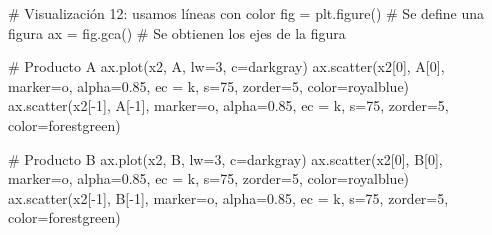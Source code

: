 \documentclass[
  letterpaper,
  DIV=11,
  numbers=noendperiod]{scrreprt}
\newenvironment{Shaded}{\begin{snugshade}}{\end{snugshade}}
\newcommand{\CommentTok}[1]{\textcolor[rgb]{0.37,0.37,0.37}{#1}}
\newcommand{\DecValTok}[1]{\textcolor[rgb]{0.68,0.00,0.00}{#1}}
\newcommand{\FloatTok}[1]{\textcolor[rgb]{0.68,0.00,0.00}{#1}}
\newcommand{\NormalTok}[1]{\textcolor[rgb]{0.00,0.23,0.31}{#1}}
\newcommand{\OperatorTok}[1]{\textcolor[rgb]{0.37,0.37,0.37}{#1}}
\newcommand{\StringTok}[1]{\textcolor[rgb]{0.13,0.47,0.30}{#1}}
\begin{document}
\begin{Shaded}
\begin{Highlighting}[]
\CommentTok{\# Visualización 12: usamos líneas con color}
\NormalTok{fig }\OperatorTok{=}\NormalTok{ plt.figure() }\CommentTok{\# Se define una figura}
\NormalTok{ax }\OperatorTok{=}\NormalTok{ fig.gca()     }\CommentTok{\# Se obtienen los ejes de la figura}

\CommentTok{\# Producto A}
\NormalTok{ax.plot(x2, A, lw}\OperatorTok{=}\DecValTok{3}\NormalTok{, c}\OperatorTok{=}\StringTok{\textquotesingle{}darkgray\textquotesingle{}}\NormalTok{)}
\NormalTok{ax.scatter(x2[}\DecValTok{0}\NormalTok{], A[}\DecValTok{0}\NormalTok{], marker}\OperatorTok{=}\StringTok{\textquotesingle{}o\textquotesingle{}}\NormalTok{, alpha}\OperatorTok{=}\FloatTok{0.85}\NormalTok{, ec }\OperatorTok{=} \StringTok{\textquotesingle{}k\textquotesingle{}}\NormalTok{, s}\OperatorTok{=}\DecValTok{75}\NormalTok{, zorder}\OperatorTok{=}\DecValTok{5}\NormalTok{, color}\OperatorTok{=}\StringTok{\textquotesingle{}royalblue\textquotesingle{}}\NormalTok{)}
\NormalTok{ax.scatter(x2[}\OperatorTok{{-}}\DecValTok{1}\NormalTok{], A[}\OperatorTok{{-}}\DecValTok{1}\NormalTok{], marker}\OperatorTok{=}\StringTok{\textquotesingle{}o\textquotesingle{}}\NormalTok{, alpha}\OperatorTok{=}\FloatTok{0.85}\NormalTok{, ec }\OperatorTok{=} \StringTok{\textquotesingle{}k\textquotesingle{}}\NormalTok{, s}\OperatorTok{=}\DecValTok{75}\NormalTok{, zorder}\OperatorTok{=}\DecValTok{5}\NormalTok{, color}\OperatorTok{=}\StringTok{\textquotesingle{}forestgreen\textquotesingle{}}\NormalTok{)}

\CommentTok{\# Producto B}
\NormalTok{ax.plot(x2, B, lw}\OperatorTok{=}\DecValTok{3}\NormalTok{, c}\OperatorTok{=}\StringTok{\textquotesingle{}darkgray\textquotesingle{}}\NormalTok{)}
\NormalTok{ax.scatter(x2[}\DecValTok{0}\NormalTok{], B[}\DecValTok{0}\NormalTok{], marker}\OperatorTok{=}\StringTok{\textquotesingle{}o\textquotesingle{}}\NormalTok{, alpha}\OperatorTok{=}\FloatTok{0.85}\NormalTok{, ec }\OperatorTok{=} \StringTok{\textquotesingle{}k\textquotesingle{}}\NormalTok{, s}\OperatorTok{=}\DecValTok{75}\NormalTok{, zorder}\OperatorTok{=}\DecValTok{5}\NormalTok{, color}\OperatorTok{=}\StringTok{\textquotesingle{}royalblue\textquotesingle{}}\NormalTok{)}
\NormalTok{ax.scatter(x2[}\OperatorTok{{-}}\DecValTok{1}\NormalTok{], B[}\OperatorTok{{-}}\DecValTok{1}\NormalTok{], marker}\OperatorTok{=}\StringTok{\textquotesingle{}o\textquotesingle{}}\NormalTok{, alpha}\OperatorTok{=}\FloatTok{0.85}\NormalTok{, ec }\OperatorTok{=} \StringTok{\textquotesingle{}k\textquotesingle{}}\NormalTok{, s}\OperatorTok{=}\DecValTok{75}\NormalTok{, zorder}\OperatorTok{=}\DecValTok{5}\NormalTok{, color}\OperatorTok{=}\StringTok{\textquotesingle{}forestgreen\textquotesingle{}}\NormalTok{)}


\end{Highlighting}
\end{Shaded}
\end{document}
